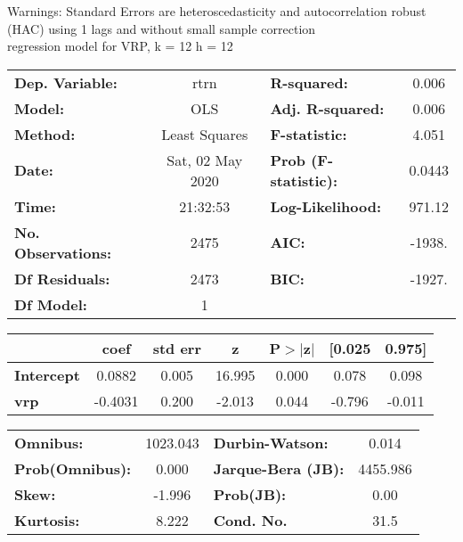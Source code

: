Warnings: \newline
 [1] Standard Errors are heteroscedasticity and autocorrelation robust (HAC) using 1 lags and without small sample correction\\ 

regression model for VRP, k = 12 h = 12\begin{center}
\begin{tabular}{lclc}
\toprule
\textbf{Dep. Variable:}    &       rtrn       & \textbf{  R-squared:         } &     0.006   \\
\textbf{Model:}            &       OLS        & \textbf{  Adj. R-squared:    } &     0.006   \\
\textbf{Method:}           &  Least Squares   & \textbf{  F-statistic:       } &     4.051   \\
\textbf{Date:}             & Sat, 02 May 2020 & \textbf{  Prob (F-statistic):} &   0.0443    \\
\textbf{Time:}             &     21:32:53     & \textbf{  Log-Likelihood:    } &    971.12   \\
\textbf{No. Observations:} &        2475      & \textbf{  AIC:               } &    -1938.   \\
\textbf{Df Residuals:}     &        2473      & \textbf{  BIC:               } &    -1927.   \\
\textbf{Df Model:}         &           1      & \textbf{                     } &             \\
\bottomrule
\end{tabular}
\begin{tabular}{lcccccc}
                   & \textbf{coef} & \textbf{std err} & \textbf{z} & \textbf{P$> |$z$|$} & \textbf{[0.025} & \textbf{0.975]}  \\
\midrule
\textbf{Intercept} &       0.0882  &        0.005     &    16.995  &         0.000        &        0.078    &        0.098     \\
\textbf{vrp}       &      -0.4031  &        0.200     &    -2.013  &         0.044        &       -0.796    &       -0.011     \\
\bottomrule
\end{tabular}
\begin{tabular}{lclc}
\textbf{Omnibus:}       & 1023.043 & \textbf{  Durbin-Watson:     } &    0.014  \\
\textbf{Prob(Omnibus):} &   0.000  & \textbf{  Jarque-Bera (JB):  } & 4455.986  \\
\textbf{Skew:}          &  -1.996  & \textbf{  Prob(JB):          } &     0.00  \\
\textbf{Kurtosis:}      &   8.222  & \textbf{  Cond. No.          } &     31.5  \\
\bottomrule
\end{tabular}
\end{center}

